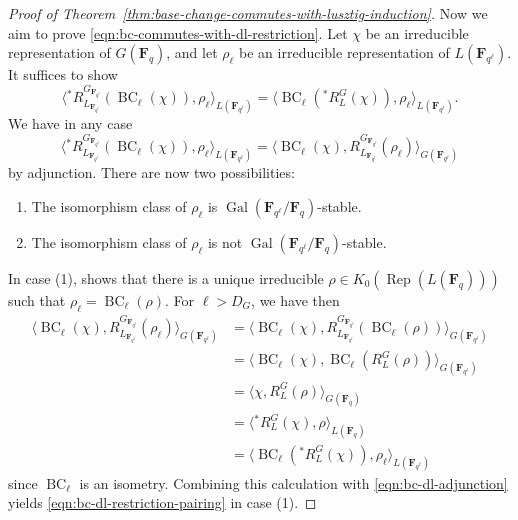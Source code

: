 \documentclass[11pt,reqno]{amsart}
\theoremstyle{definition}
\newcommand{\F}{{\mathbf F}}
\DeclareMathOperator{\BC}{BC}
\DeclareMathOperator{\Gal}{Gal}
\DeclareMathOperator{\Rep}{Rep}
\begin{document}
\begin{proof}[Proof of Theorem~\ref{thm:base-change-commutes-with-lusztig-induction}]
    Now we aim to prove \eqref{eqn:bc-commutes-with-dl-restriction}. Let $\chi$ be an irreducible representation of $G(\F_q)$, and let $\rho_\ell$ be an irreducible representation of $L(\F_{q^\ell})$. It suffices to show
    \begin{equation}\label{eqn:bc-dl-restriction-pairing}
        \langle {}^*R^{G_{\F_{q^\ell}}}_{L_{\F_{q^\ell}}}(\BC_\ell(\chi)), \rho_\ell\rangle_{L(\F_{q^\ell})} = \langle \BC_\ell({}^*R^G_L(\chi)), \rho_\ell\rangle_{L(\F_{q^\ell})}.
    \end{equation}
    We have in any case
    \begin{equation}\label{eqn:bc-dl-adjunction}
    \langle {}^*R_{L_{\F_{q^\ell}}}^{G_{\F_{q^\ell}}}(\BC_\ell(\chi)), \rho_\ell\rangle_{L(\F_{q^\ell})} = \langle\BC_\ell(\chi), R_{L_{\F_{q^\ell}}}^{G_{\F_{q^\ell}}}(\rho_\ell)\rangle_{G(\F_{q^\ell})}
    \end{equation}
    by adjunction. There are now two possibilities:
    \begin{enumerate}
        \item The isomorphism class of $\rho_\ell$ is $\Gal(\F_{q^\ell}/\F_q)$-stable.
        \item The isomorphism class of $\rho_\ell$ is not $\Gal(\F_{q^\ell}/\F_q)$-stable.
    \end{enumerate}

    In case (1), \cite[Theorem 3]{Gla68} shows that there is a unique irreducible $\rho \in K_0(\Rep(L(\F_q)))$ such that $\rho_\ell = \BC_\ell(\rho)$. For $\ell > D_G$, we have then
    \begin{align*}
        \langle\BC_\ell(\chi), R_{L_{\F_{q^\ell}}}^{G_{\F_{q^\ell}}}(\rho_\ell)\rangle_{G(\F_{q^\ell})} &= \langle\BC_\ell(\chi), R_{L_{\F_{q^\ell}}}^{G_{\F_{q^\ell}}}(\BC_\ell(\rho))\rangle_{G(\F_{q^\ell})} \\
            &= \langle\BC_\ell(\chi), \BC_\ell(R_L^G(\rho))\rangle_{G(\F_{q^\ell})} \\
            &= \langle\chi, R_L^G(\rho)\rangle_{G(\F_q)} \\
            &= \langle {}^*R^G_L(\chi), \rho\rangle_{L(\F_q)} \\
            &= \langle\BC_\ell({}^*R^G_L(\chi)), \rho_\ell\rangle_{L(\F_{q^\ell})}
    \end{align*}
    since $\BC_\ell$ is an isometry. Combining this calculation with \eqref{eqn:bc-dl-adjunction} yields \eqref{eqn:bc-dl-restriction-pairing} in case (1).


\end{proof}
\end{document}
